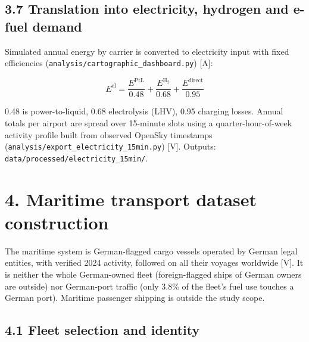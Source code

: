 \documentclass[11pt,a4paper]{article}
\begin{document}
\subsection*{3.7 Translation into electricity, hydrogen and e-fuel demand}

Simulated annual energy by carrier is converted to electricity input with fixed efficiencies (\texttt{analysis/\allowbreak{}cartographic\_\allowbreak{}dashboard.\allowbreak{}py}) [A]:

\[
E^{\mathrm{el}} = \frac{E^{\mathrm{PtL}}}{0.48} + \frac{E^{\mathrm{H_2}}}{0.68} + \frac{E^{\mathrm{direct}}}{0.95}
\]

0.48 is power-to-liquid, 0.68 electrolysis (LHV), 0.95 charging losses. Annual totals per airport are spread over 15-minute slots using a quarter-hour-of-week activity profile built from observed OpenSky timestamps (\texttt{analysis/\allowbreak{}export\_\allowbreak{}electricity\_\allowbreak{}15min.\allowbreak{}py}) [V]. Outputs: \texttt{data/\allowbreak{}processed/\allowbreak{}electricity\_\allowbreak{}15min/\allowbreak{}}.

\section*{4. Maritime transport dataset construction}

The maritime system is German-flagged cargo vessels operated by German legal entities, with verified 2024 activity, followed on all their voyages worldwide [V]. It is neither the whole German-owned fleet (foreign-flagged ships of German owners are outside) nor German-port traffic (only 3.8\% of the fleet's fuel use touches a German port). Maritime passenger shipping is outside the study scope.

\subsection*{4.1 Fleet selection and identity}
\end{document}
